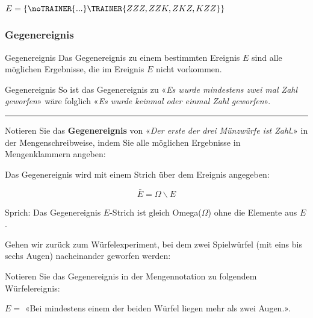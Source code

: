 $E = \{\noTRAINER{...}\TRAINER{ZZZ,ZZK, ZKZ, KZZ\}}$

\newpage
\subsubsection{Gegenereignis}
\begin{definition}{Gegenereignis}{}
  Das Gegenereignis zu einem bestimmten Ereignis $E$ sind alle möglichen Ergebnisse,
  die im Ereignis $E$ nicht vorkommen.
\end{definition}

\begin{beispiel}{Gegenereignis}{}
So ist das Gegenereignis zu «\textit{Es wurde mindestens zwei mal Zahl
geworfen}» wäre folglich «\textit{Es wurde keinmal oder einmal Zahl
  geworfen}».
\end{beispiel}

\vspace{2mm}

\hrule

Notieren Sie das \textbf{Gegenereignis} von «\textit{Der erste der drei Münzwürfe
  ist Zahl.}» in der Mengenschreibweise, indem Sie alle
möglichen Ergebnisse in Mengenklammern angeben:



\begin{definition}{}{}
Das Gegenereignis wird mit einem Strich über dem Ereignis angegeben:

$$\bar{E} = \Omega \backslash E$$
\end{definition}

Sprich: Das Gegenereignis $E$-Strich ist gleich Omega($\Omega$) ohne die Elemente
aus $E$.

Gehen wir zurück zum Würfelexperiment, bei dem zwei Spielwürfel (mit
eins bis sechs Augen) nacheinander geworfen werden:

Notieren Sie das Gegenereignis in der Mengennotation zu folgendem
Würfelereignis:

$E=$ «Bei mindestens einem der beiden Würfel liegen
mehr als zwei Augen.».

